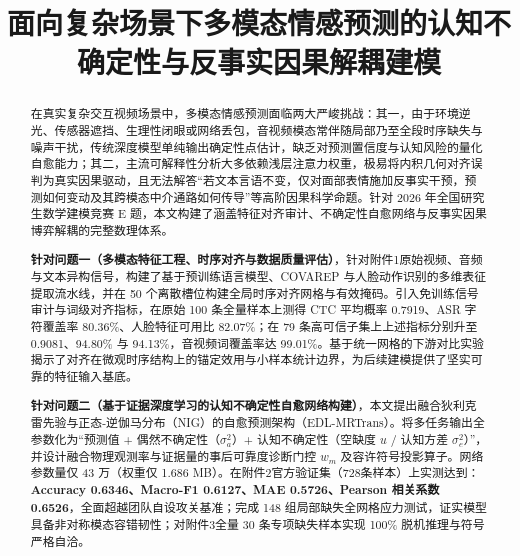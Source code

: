 \documentclass{huawei-mcm}
\title{面向复杂场景下多模态情感预测的认知不确定性与反事实因果解耦建模}
\begin{document}
\makecover

\frontmatter


\begin{abstract}
在真实复杂交互视频场景中，多模态情感预测面临两大严峻挑战：其一，由于环境逆光、传感器遮挡、生理性闭眼或网络丢包，音视频模态常伴随局部乃至全段时序缺失与噪声干扰，传统深度模型单纯输出确定性点估计，缺乏对预测置信度与认知风险的量化自愈能力；其二，主流可解释性分析大多依赖浅层注意力权重，极易将内积几何对齐误判为真实因果驱动，且无法解答“若文本言语不变，仅对面部表情施加反事实干预，预测如何变动及其跨模态中介通路如何传导”等高阶因果科学命题。针对 2026 年全国研究生数学建模竞赛 E 题，本文构建了涵盖特征对齐审计、不确定性自愈网络与反事实因果博弈解耦的完整数理体系。

\textbf{针对问题一（多模态特征工程、时序对齐与数据质量评估）}，针对附件1原始视频、音频与文本异构信号，构建了基于预训练语言模型、COVAREP 与人脸动作识别的多维表征提取流水线，并在 50 个离散槽位构建全局时序对齐网格与有效掩码。引入免训练信号审计与词级对齐指标，在原始 100 条全量样本上测得 CTC 平均概率 0.7919、ASR 字符覆盖率 80.36\%、人脸特征可用比 82.07\%；在 79 条高可信子集上上述指标分别升至 0.9081、94.80\% 与 94.13\%，音视频词覆盖率达 99.01\%。基于统一网格的下游对比实验揭示了对齐在微观时序结构上的锚定效用与小样本统计边界，为后续建模提供了坚实可靠的特征输入基底。

\textbf{针对问题二（基于证据深度学习的认知不确定性自愈网络构建）}，本文提出融合狄利克雷先验与正态-逆伽马分布（NIG）的自愈预测架构（EDL-MRTrans）。将多任务输出全参数化为“预测值 + 偶然不确定性（$\sigma_a^2$）+ 认知不确定性（空缺度 $u$ / 认知方差 $\sigma_e^2$）”，并设计融合物理观测率与证据量的事后可靠度诊断门控 $w_m$ 及容许符号投影算子。网络参数量仅 43 万（权重仅 1.686 MB）。在附件2官方验证集（728条样本）上实测达到：\textbf{Accuracy 0.6346、Macro-F1 0.6127、MAE 0.5726、Pearson 相关系数 0.6526}，全面超越团队自设攻关基准；完成 148 组局部缺失全网格应力测试，证实模型具备非对称模态容错韧性；对附件3全量 30 条专项缺失样本实现 100\% 脱机推理与符号严格自洽。


\end{abstract}
\end{document}
